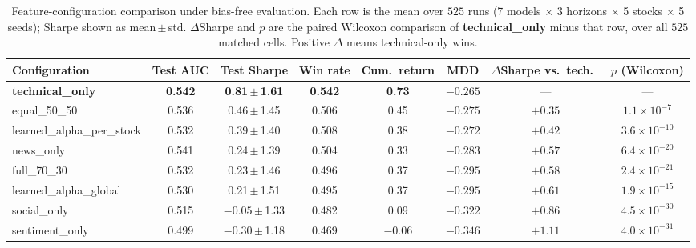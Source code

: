 \documentclass[conference]{IEEEtran}
\begin{document}
\begin{table}[t]
\caption{Feature-configuration comparison under bias-free evaluation. Each row
is the mean over $525$ runs (7 models $\times$ 3 horizons $\times$ 5 stocks
$\times$ 5 seeds); Sharpe shown as mean\,$\pm$\,std. $\Delta$Sharpe and $p$ are
the paired Wilcoxon comparison of \textbf{technical\_only} minus that row, over
all $525$ matched cells. Positive $\Delta$ means technical-only wins.}
\label{tab:ablation}
\centering
\small
\begin{tabular}{lccccccc}
\toprule
Configuration & Test AUC & Test Sharpe & Win rate & Cum.\ return & MDD & $\Delta$Sharpe vs.\ tech.\ & $p$ (Wilcoxon) \\
\midrule
\textbf{technical\_only}        & \textbf{0.542} & \textbf{0.81\,$\pm$\,1.61} & \textbf{0.542} & \textbf{0.73} & $\mathbf{-0.265}$ & --- & --- \\
equal\_50\_50                   & 0.536 & 0.46\,$\pm$\,1.45 & 0.506 & 0.45 & $-0.275$ & $+0.35$ & $1.1\times10^{-7}$ \\
learned\_alpha\_per\_stock      & 0.532 & 0.39\,$\pm$\,1.40 & 0.508 & 0.38 & $-0.272$ & $+0.42$ & $3.6\times10^{-10}$ \\
news\_only                      & 0.541 & 0.24\,$\pm$\,1.39 & 0.504 & 0.33 & $-0.283$ & $+0.57$ & $6.4\times10^{-20}$ \\
full\_70\_30                    & 0.532 & 0.23\,$\pm$\,1.46 & 0.496 & 0.37 & $-0.295$ & $+0.58$ & $2.4\times10^{-21}$ \\
learned\_alpha\_global          & 0.530 & 0.21\,$\pm$\,1.51 & 0.495 & 0.37 & $-0.295$ & $+0.61$ & $1.9\times10^{-15}$ \\
social\_only                    & 0.515 & $-0.05$\,$\pm$\,1.33 & 0.482 & 0.09 & $-0.322$ & $+0.86$ & $4.5\times10^{-30}$ \\
sentiment\_only                 & 0.499 & $-0.30$\,$\pm$\,1.18 & 0.469 & $-0.06$ & $-0.346$ & $+1.11$ & $4.0\times10^{-31}$ \\
\bottomrule
\end{tabular}
\end{table}
\end{document}
